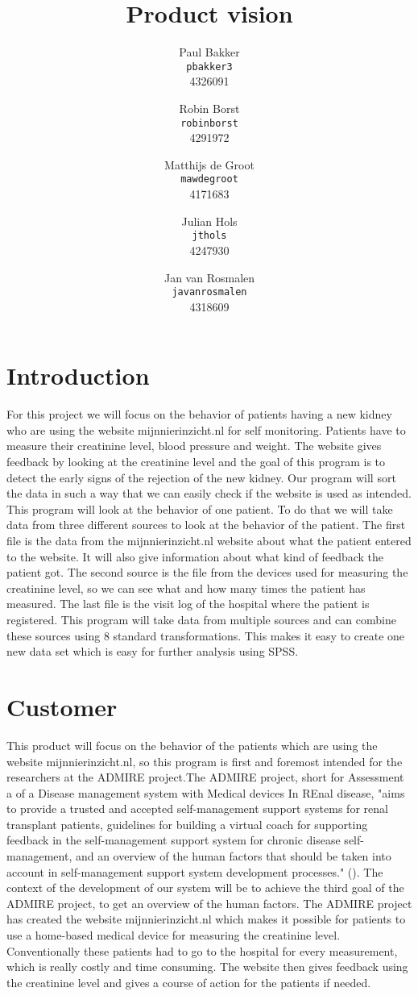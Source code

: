 \documentclass[11pt,twoside,a4paper]{article}
\title{Product vision}
\author{
	Paul Bakker \\ \texttt{pbakker3} \\ 4326091 \and
    Robin Borst \\ \texttt{robinborst} \\ 4291972 \and
    Matthijs de Groot \\ \texttt{mawdegroot} \\ 4171683 \and
    Julian Hols \\ \texttt{jthols} \\ 4247930 \and
    Jan van Rosmalen \\ \texttt{javanrosmalen} \\ 4318609
}
\begin{document}
\maketitle
\newpage
\tableofcontents
\newpage
\section{Introduction}
For this project we will focus on the behavior of patients having a new kidney who are using the website mijnnierinzicht.nl for self monitoring. Patients have to measure their creatinine level, blood pressure and weight. The website gives feedback by looking at the creatinine level and the goal of this program is to detect the early signs of the rejection of the new kidney. Our program will sort the data in such a way that we can easily check if the website is used as intended. This program will look at the behavior of one patient. To do that we will take data from three different sources to look at the behavior of the patient. The first file is the data from the mijnnierinzicht.nl website about what the patient entered to the website. It will also give information about what kind of feedback the patient got.
The second source is the file from the devices used for measuring the creatinine level, so we can see what and how many times the patient has measured. The last file is the visit log of the hospital where the patient is registered. 
This program will take data from multiple sources and can combine these sources using 8 standard transformations. This makes it easy to create one new data set which is easy for further analysis using SPSS.



\section{Customer}

This product will focus on the behavior of the patients which are using the website mijnnierinzicht.nl, so this program is first and foremost intended for the researchers at the ADMIRE project.The ADMIRE project, short for Assessment a of a Disease management system with Medical devices In REnal disease, "aims to provide a trusted and accepted self-management support systems for renal transplant patients, guidelines for building a virtual coach for supporting feedback in the self-management support system for chronic disease self-management, and an overview of the human factors that should be taken into account in self-management support system development processes." (\cite{PROJECT}). The context of the development of our system will be to achieve the third goal of the ADMIRE project, to get an overview of the human factors. 
 The ADMIRE project has created the website mijnnierinzicht.nl which makes it possible for patients to use a home-based medical device for measuring the creatinine level. Conventionally these patients had to go to the hospital for every measurement, which is really costly and time consuming. The website then gives feedback using the creatinine level and gives a course of action for the patients if needed.
\end{document}
